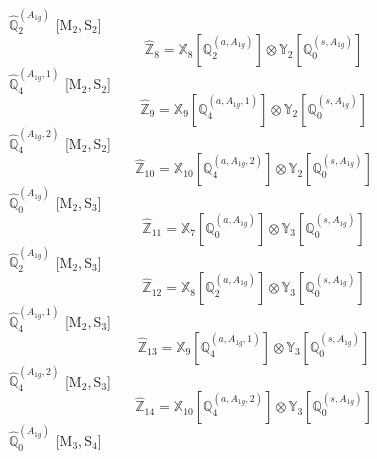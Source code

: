 \documentclass[fleqn,10pt,landscape]{article}
\begin{document}
\begin{itemize}
\noindent {} $\,\,\,\hat{\mathbb{Q}}_{2}^{(A_{1g})}$ [M$_{2}$,\,S$_{2}$]
\begin{dmath*}
\hat{\mathbb{Z}}_{8}=\mathbb{X}_{8}[\mathbb{Q}_{2}^{(a,A_{1g})}] \otimes\mathbb{Y}_{2}[\mathbb{Q}_{0}^{(s,A_{1g})}]
\end{dmath*}
\vspace{4mm}
\noindent {} $\,\,\,\hat{\mathbb{Q}}_{4}^{(A_{1g},1)}$ [M$_{2}$,\,S$_{2}$]
\begin{dmath*}
\hat{\mathbb{Z}}_{9}=\mathbb{X}_{9}[\mathbb{Q}_{4}^{(a,A_{1g},1)}] \otimes\mathbb{Y}_{2}[\mathbb{Q}_{0}^{(s,A_{1g})}]
\end{dmath*}
\vspace{4mm}
\noindent {} $\,\,\,\hat{\mathbb{Q}}_{4}^{(A_{1g},2)}$ [M$_{2}$,\,S$_{2}$]
\begin{dmath*}
\hat{\mathbb{Z}}_{10}=\mathbb{X}_{10}[\mathbb{Q}_{4}^{(a,A_{1g},2)}] \otimes\mathbb{Y}_{2}[\mathbb{Q}_{0}^{(s,A_{1g})}]
\end{dmath*}
\vspace{4mm}
\noindent {} $\,\,\,\hat{\mathbb{Q}}_{0}^{(A_{1g})}$ [M$_{2}$,\,S$_{3}$]
\begin{dmath*}
\hat{\mathbb{Z}}_{11}=\mathbb{X}_{7}[\mathbb{Q}_{0}^{(a,A_{1g})}] \otimes\mathbb{Y}_{3}[\mathbb{Q}_{0}^{(s,A_{1g})}]
\end{dmath*}
\vspace{4mm}
\noindent {} $\,\,\,\hat{\mathbb{Q}}_{2}^{(A_{1g})}$ [M$_{2}$,\,S$_{3}$]
\begin{dmath*}
\hat{\mathbb{Z}}_{12}=\mathbb{X}_{8}[\mathbb{Q}_{2}^{(a,A_{1g})}] \otimes\mathbb{Y}_{3}[\mathbb{Q}_{0}^{(s,A_{1g})}]
\end{dmath*}
\vspace{4mm}
\noindent {} $\,\,\,\hat{\mathbb{Q}}_{4}^{(A_{1g},1)}$ [M$_{2}$,\,S$_{3}$]
\begin{dmath*}
\hat{\mathbb{Z}}_{13}=\mathbb{X}_{9}[\mathbb{Q}_{4}^{(a,A_{1g},1)}] \otimes\mathbb{Y}_{3}[\mathbb{Q}_{0}^{(s,A_{1g})}]
\end{dmath*}
\vspace{4mm}
\noindent {} $\,\,\,\hat{\mathbb{Q}}_{4}^{(A_{1g},2)}$ [M$_{2}$,\,S$_{3}$]
\begin{dmath*}
\hat{\mathbb{Z}}_{14}=\mathbb{X}_{10}[\mathbb{Q}_{4}^{(a,A_{1g},2)}] \otimes\mathbb{Y}_{3}[\mathbb{Q}_{0}^{(s,A_{1g})}]
\end{dmath*}
\vspace{4mm}
\noindent {} $\,\,\,\hat{\mathbb{Q}}_{0}^{(A_{1g})}$ [M$_{3}$,\,S$_{4}$]

\end{itemize}
\end{document}
